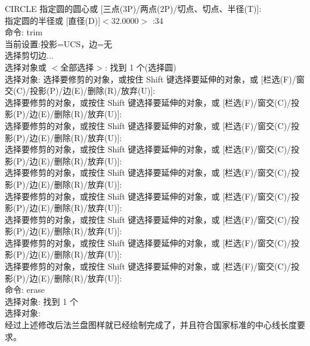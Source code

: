 \noindent
CIRCLE 指定圆的圆心或 [三点(3P)/两点(2P)/切点、切点、半径(T)]:\\
指定圆的半径或 [直径(D)]$<32.0000>$ :34\\
命令: trim\\
当前设置:投影=UCS，边=无\\
选择剪切边...\\
选择对象或 $<$全部选择$>$:  找到 1 个(选择圆)\\
选择对象:
选择要修剪的对象，或按住 Shift 键选择要延伸的对象，或
[栏选(F)/窗交(C)/投影(P)/边(E)/删除(R)/放弃(U)]:\\
选择要修剪的对象，或按住 Shift 键选择要延伸的对象，或
[栏选(F)/窗交(C)/投影(P)/边(E)/删除(R)/放弃(U)]:\\
选择要修剪的对象，或按住 Shift 键选择要延伸的对象，或
[栏选(F)/窗交(C)/投影(P)/边(E)/删除(R)/放弃(U)]:\\
选择要修剪的对象，或按住 Shift 键选择要延伸的对象，或
[栏选(F)/窗交(C)/投影(P)/边(E)/删除(R)/放弃(U)]:\\
选择要修剪的对象，或按住 Shift 键选择要延伸的对象，或
[栏选(F)/窗交(C)/投影(P)/边(E)/删除(R)/放弃(U)]: \\
选择要修剪的对象，或按住 Shift 键选择要延伸的对象，或
[栏选(F)/窗交(C)/投影(P)/边(E)/删除(R)/放弃(U)]:\\
选择要修剪的对象，或按住 Shift 键选择要延伸的对象，或
[栏选(F)/窗交(C)/投影(P)/边(E)/删除(R)/放弃(U)]:\\
选择要修剪的对象，或按住 Shift 键选择要延伸的对象，或
[栏选(F)/窗交(C)/投影(P)/边(E)/删除(R)/放弃(U)]:\\
选择要修剪的对象，或按住 Shift 键选择要延伸的对象，或
[栏选(F)/窗交(C)/投影(P)/边(E)/删除(R)/放弃(U)]:\\
命令: erase\\
选择对象: 找到 1 个\\
选择对象:\\

\indent
经过上述修改后法兰盘图样就已经绘制完成了，并且符合国家标准的中心线长度要求。
\endinput
